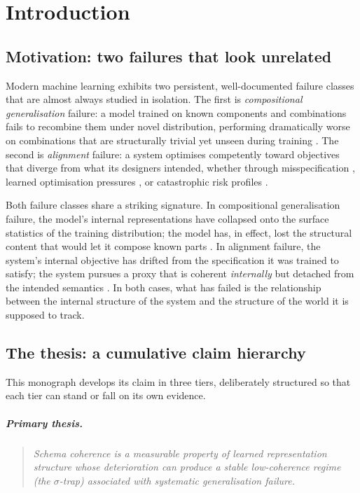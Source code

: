 \chapter{Introduction}
\label{ch:introduction}

\section{Motivation: two failures that look unrelated}

Modern machine learning exhibits two persistent, well-documented failure classes that
are almost always studied in isolation. The first is \emph{compositional generalisation}
failure: a model trained on known components and combinations fails to recombine them
under novel distribution, performing dramatically worse on combinations that are
structurally trivial yet unseen during training \citep{lake2018generalization,
keysers2020measuring,hupkes2023taxonomy}. The second is \emph{alignment} failure: a
system optimises competently toward objectives that diverge from what its designers
intended, whether through misspecification \citep{amodei2016concrete}, learned
optimisation pressures \citep{hubinger2019risks}, or catastrophic risk profiles
\citep{hendrycks2023overview}.

Both failure classes share a striking signature. In compositional generalisation
failure, the model's internal representations have collapsed onto the surface
statistics of the training distribution; the model has, in effect, lost the structural
content that would let it compose known parts \citep{lake2018generalization,
geirhos2020shortcut}. In alignment failure, the system's internal objective has
drifted from the specification it was trained to satisfy; the system pursues a proxy
that is coherent \emph{internally} but detached from the intended semantics
\citep{amodei2016concrete,russell2019human}. In both cases, what has failed is the
relationship between the internal structure of the system and the structure of the
world it is supposed to track.

\section{The thesis: a cumulative claim hierarchy}

This monograph develops its claim in three tiers, deliberately structured so that each
tier can stand or fall on its own evidence.

\paragraph{Primary thesis.}
\begin{quote}
\emph{Schema coherence is a measurable property of learned representation structure
whose deterioration can produce a stable low-coherence regime (the $\sigma$-trap)
associated with systematic generalisation failure.}
\end{quote}

